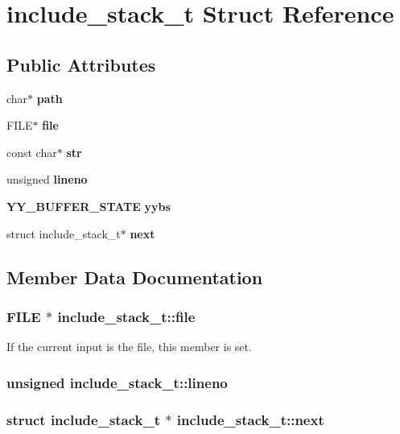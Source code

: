\section{include\_\-stack\_\-t  Struct Reference}
\label{structinclude__stack__t}
\subsection*{Public Attributes}
\begin{CompactItemize}
\item 
char$\ast$ {\bf path}
\item 
FILE$\ast$ {\bf file}
\item 
const char$\ast$ {\bf str}
\item 
unsigned {\bf lineno}
\item 
{\bf YY\_\-BUFFER\_\-STATE} {\bf yybs}
\item 
struct include\_\-stack\_\-t$\ast$ {\bf next}
\end{CompactItemize}


\subsection{Member Data Documentation}
\subsubsection{\setlength{\rightskip}{0pt plus 5cm}FILE $\ast$ include\_\-stack\_\-t::file}\label{structinclude__stack__t_m1}


If the current input is the file, this member is set. 
\subsubsection{\setlength{\rightskip}{0pt plus 5cm}unsigned include\_\-stack\_\-t::lineno}\label{structinclude__stack__t_m3}


\subsubsection{\setlength{\rightskip}{0pt plus 5cm}struct include\_\-stack\_\-t $\ast$ include\_\-stack\_\-t::next}\label{structinclude__stack__t_m5}


